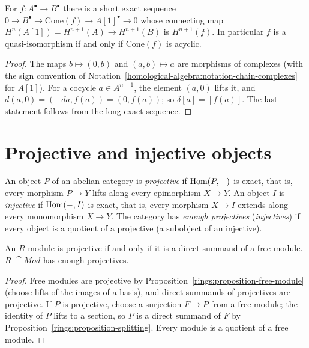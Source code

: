 \begin{proposition}\label{homological-algebra:proposition-cone}
For $f \colon A^\bullet \to B^\bullet$ there is a short exact sequence
$0 \to B^\bullet \to \mathrm{Cone}(f) \to A[1]^\bullet \to 0$ whose connecting map $H^n(A[1]) = H^{n+1}(A) \to H^{n+1}(B)$ is
$H^{n+1}(f)$. In particular $f$ is a quasi-isomorphism if and only if $\mathrm{Cone}(f)$ is acyclic.
\end{proposition}

\begin{proof}
The maps $b \mapsto (0, b)$ and $(a, b) \mapsto a$ are morphisms of complexes (with the sign convention of
Notation~\ref{homological-algebra:notation-chain-complexes} for $A[1]$). For a cocycle $a \in A^{n+1}$, the element
$(a, 0)$ lifts it, and $d(a, 0) = (-da, f(a)) = (0, f(a))$; so $\delta[a] = [f(a)]$. The last statement follows from the long
exact sequence.
\end{proof}

\section{Projective and injective objects}\label{homological-algebra:section-projective-injective}

\begin{definition}\label{homological-algebra:definition-projective-injective}
An object $P$ of an abelian category is \emph{projective} if $\operatorname{Hom}(P, -)$ is exact, that is, every morphism $P \to Y$
lifts along every epimorphism $X \to Y$. An object $I$ is \emph{injective} if $\operatorname{Hom}(-, I)$ is exact, that is, every morphism
$X \to I$ extends along every monomorphism $X \to Y$. The category has \emph{enough projectives} (\emph{injectives}) if
every object is a quotient of a projective (a subobject of an injective).
\end{definition}

\begin{proposition}\label{homological-algebra:proposition-projective-modules}
An $R$-module is projective if and only if it is a direct summand of a free module. $R\text{-}\cat{Mod}$ has enough
projectives.
\end{proposition}

\begin{proof}
Free modules are projective by Proposition~\ref{rings:proposition-free-module} (choose lifts of the images of a basis),
and direct summands of projectives are projective. If $P$ is projective, choose a surjection $F \to P$ from a free module;
the identity of $P$ lifts to a section, so $P$ is a direct summand of $F$ by Proposition~\ref{rings:proposition-splitting}.
Every module is a quotient of a free module.
\end{proof}

